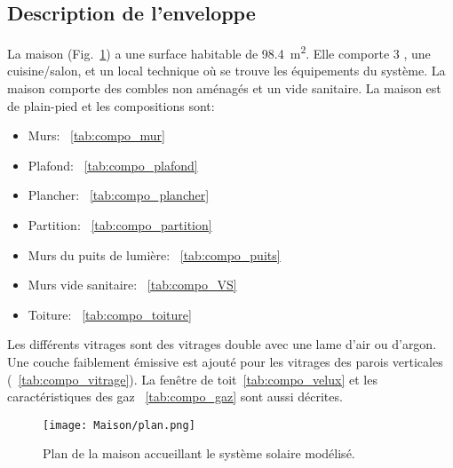\subsection{Description de l’enveloppe} %
\label{sub:description_de_l_enveloppe}
La maison (Fig.~\ref{fig:plan_maison}) a une surface habitable de 98.4~\si{m^2}. Elle comporte
3 , une cuisine/salon, et un local technique
où se trouve les équipements du système. La maison comporte des combles non aménagés
et un vide sanitaire. La maison est de plain-pied et les compositions sont:
\begin{itemize}
    \item Murs: ~\autoref{tab:compo_mur}
    \item Plafond: ~\autoref{tab:compo_plafond}
    \item Plancher: ~\autoref{tab:compo_plancher}
    \item Partition: ~\autoref{tab:compo_partition}
    \item Murs du puits de lumière: ~\autoref{tab:compo_puits}
    \item Murs vide sanitaire: ~\autoref{tab:compo_VS}
    \item Toiture: ~\autoref{tab:compo_toiture}
\end{itemize}
Les différents vitrages sont des vitrages double avec une lame d’air ou d’argon.
Une couche faiblement émissive est ajouté pour les vitrages des parois verticales (~\autoref{tab:compo_vitrage}).
La fenêtre de toit~\autoref{tab:compo_velux} et les caractéristiques des gaz  ~\autoref{tab:compo_gaz}
sont aussi décrites.

\begin{figure}
    \begin{center}
        \texttt{[image: Maison/plan.png]}
    \end{center}
    \caption{Plan de la maison accueillant le système solaire modélisé.
             \label{fig:plan_maison}}
\end{figure}

